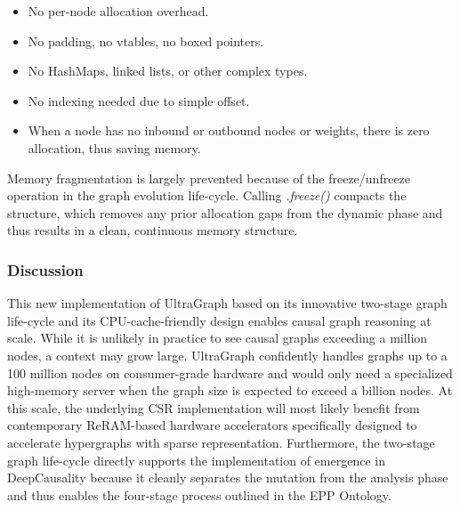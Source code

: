 \begin{itemize}
	\item No per-node allocation overhead.
	\item No padding, no vtables, no boxed pointers.
	\item No HashMaps, linked lists, or other complex types.
	\item No indexing needed due to simple offset.
	\item When a node has no inbound or outbound nodes or weights, there is zero allocation, thus saving memory.
\end{itemize}


Memory fragmentation is largely prevented because of the freeze/unfreeze operation in the graph evolution life-cycle. Calling \textit{.freeze()} compacts the structure, which removes any prior allocation gaps from the dynamic phase and thus results in a clean, continuous memory structure.

\subsubsection{Discussion}

This new implementation of UltraGraph based on its innovative two-stage graph life-cycle and its CPU-cache-friendly design enables causal graph reasoning at scale. While it is unlikely in practice to see causal graphs exceeding a million nodes, a context may grow large. UltraGraph confidently handles graphs up to a 100 million nodes on consumer-grade hardware and would only need a specialized high-memory server when the graph size is expected to exceed a billion nodes. At this scale, the underlying CSR implementation will most likely benefit from contemporary ReRAM-based\cite{zheng2023phgraph} hardware accelerators specifically designed to accelerate hypergraphs with sparse representation. 
Furthermore, the two-stage graph life-cycle directly supports the implementation of emergence in DeepCausality because it cleanly separates the mutation from the analysis phase and thus enables the four-stage process outlined in the EPP Ontology.  

\newpage